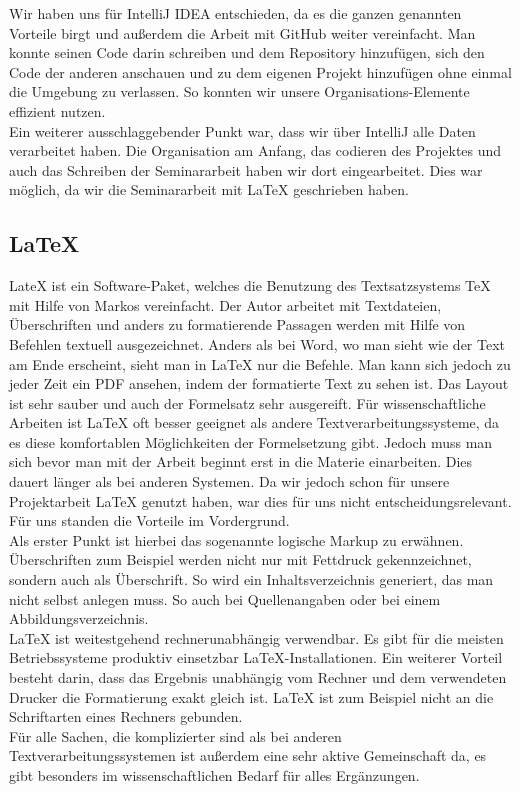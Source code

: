 	Wir haben uns für IntelliJ IDEA entschieden, da es die ganzen genannten Vorteile birgt und außerdem die Arbeit mit GitHub weiter vereinfacht. Man konnte seinen Code darin schreiben und dem Repository hinzufügen, sich den Code der anderen anschauen und zu dem eigenen Projekt hinzufügen ohne einmal die Umgebung zu verlassen.  So konnten wir unsere Organisations-Elemente effizient nutzen. 
	\\Ein weiterer ausschlaggebender Punkt war, dass wir über IntelliJ alle Daten verarbeitet haben. Die Organisation am Anfang, das codieren des Projektes und auch das Schreiben der Seminararbeit haben wir dort eingearbeitet. Dies war möglich, da wir die Seminararbeit mit LaTeX geschrieben haben.
	
	\subsection{LaTeX}
	LateX ist ein Software-Paket, welches die Benutzung des Textsatzsystems TeX mit Hilfe von Markos vereinfacht. Der Autor arbeitet mit Textdateien, Überschriften und anders zu formatierende Passagen werden mit Hilfe von Befehlen textuell ausgezeichnet. Anders als bei Word, wo man sieht wie der Text am Ende erscheint, sieht man in LaTeX nur die Befehle. Man kann sich jedoch zu jeder Zeit ein PDF ansehen, indem der formatierte Text zu sehen ist. Das Layout ist sehr sauber und auch der Formelsatz sehr ausgereift. Für wissenschaftliche Arbeiten ist LaTeX oft besser geeignet als andere Textverarbeitungssysteme, da es diese komfortablen Möglichkeiten der Formelsetzung gibt. Jedoch muss man sich bevor man mit der Arbeit beginnt erst in die Materie einarbeiten. Dies dauert länger als bei anderen Systemen. Da wir jedoch schon für unsere Projektarbeit LaTeX genutzt haben, war dies für uns nicht entscheidungsrelevant. Für uns standen die Vorteile im Vordergrund.
	\\Als erster Punkt ist hierbei das sogenannte logische Markup zu erwähnen. Überschriften zum Beispiel werden nicht nur mit Fettdruck gekennzeichnet, sondern auch als Überschrift. So wird ein Inhaltsverzeichnis generiert, das man nicht selbst anlegen muss. So auch bei Quellenangaben oder bei einem Abbildungsverzeichnis.
	\\LaTeX ist weitestgehend rechnerunabhängig verwendbar. Es gibt für die meisten Betriebssysteme produktiv einsetzbar LaTeX-Installationen. Ein weiterer Vorteil besteht darin, dass das Ergebnis unabhängig vom Rechner und dem verwendeten Drucker die Formatierung exakt gleich ist. LaTeX ist zum Beispiel nicht an die Schriftarten eines Rechners gebunden.
	\\Für alle Sachen, die komplizierter sind als bei anderen Textverarbeitungssystemen ist außerdem eine sehr aktive Gemeinschaft da, es gibt besonders im wissenschaftlichen Bedarf für alles Ergänzungen.
	
